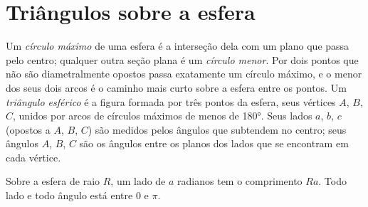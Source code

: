 \section{Triângulos sobre a esfera}

\begin{definition}\label{def:b1:spherical-astronomy:spherical-triangle}
Um \emph{círculo máximo} de uma esfera é a interseção dela com um plano que passa pelo centro; qualquer outra seção plana é um \emph{círculo menor}. Por dois pontos que não são diametralmente opostos passa exatamente um círculo máximo, e o menor dos seus dois arcos é o caminho mais curto sobre a esfera entre os pontos. Um \emph{triângulo esférico} é a figura formada por três pontos da esfera, seus vértices $A$, $B$, $C$, unidos por arcos de círculos máximos de menos de \ang{180}. Seus lados $a$, $b$, $c$ (opostos a $A$, $B$, $C$) são medidos pelos ângulos que subtendem no centro; seus ângulos $A$, $B$, $C$ são os ângulos entre os planos dos lados que se encontram em cada vértice.
\end{definition}

Sobre a esfera de raio $R$, um lado de $a$ radianos tem o comprimento $Ra$. Todo lado e todo ângulo está entre $0$ e $\pi$.

